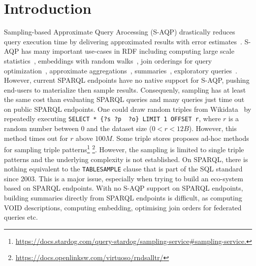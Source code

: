 
\section{Introduction}

Sampling-based Approximate Query Arocessing (S-AQP) drastically reduces query
execution time by delivering approximated results with error
estimates~\cite{DBLP:conf/sigmod/AgarwalMKTJMMS14}. S-AQP has many important use-cases in RDF including
computing large scale
statistics~\cite{soulet2019anytime,10.1007/978-3-319-18818-8_14},
embeddings with random walks~\cite{ristoski2016rdf2vec}, join
orderings for query optimization~\cite{DBLP:conf/cidr/LeisRGK017},
approximate
aggregations~\cite{DBLP:journals/tods/LiWYZ19,wang2022approximate},
summaries~\cite{10.1007/978-3-030-49461-2_10}, exploratory
queries~\cite{DBLP:conf/sigmod/AgarwalMKTJMMS14}.
%
However, current SPARQL endpoints have no native support for S-AQP,
pushing end-users to materialize then sample
results. Consequenly, sampling has at least  the same cost than evaluating
SPARQL queries and many queries just time out on public SPARQL
endpoints.
%
One could draw random triples from Wikidata~\cite{soulet2019anytime}
by repeatedly executing \lstinline[language=SPARQL]|SELECT * {?s ?p  ?o} LIMIT 1 OFFSET r|,
where $r$ is a random number between $0$ and
the dataset size ($0<r<12B$). However, this method times out for $r$
above $100M$. Some triple stores proposes ad-hoc methods for sampling
triple
patterns\footnote{\url{https://docs.stardog.com/query-stardog/sampling-service\#sampling-service.}}
\footnote{\url{https://docs.openlinksw.com/virtuoso/rndsalltr/}}.
However, the sampling is limited to single triple patterns and the
underlying complexity is not established.  On SPARQL, there is nothing
equivalent to the \texttt{TABLESAMPLE} clause that is part of the SQL
standard since 2003. This is a major issue, especially when trying to
build an eco-system based on SPARQL endpoints. With no S-AQP support
on SPARQL endpoints, building summaries directly from SPARQL endpoints
is difficult, as computing VOID descriptions, computing embedding,
optimising join orders for federated queries etc.


